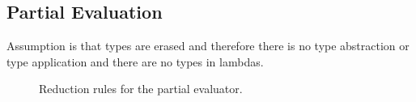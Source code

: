 \subsection{Partial Evaluation}
Assumption is that types are erased and therefore there is no type abstraction or type application and there are no types in lambdas.

\begin{figure}
\begin{multicols}{2}[]

    {}

    {}

    {}

    {}

\end{multicols}
\vspace{4pt}

    {}

    {}
    {}

\caption{Reduction rules for the partial evaluator.}
\label{fig:partial-evaluation}
\end{figure}

\clearpage
